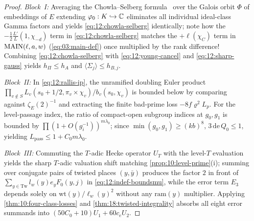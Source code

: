 
\begin{proof}
\emph{Block~I:} Averaging the Chowla--Selberg formula~\cite{ChowlaSelberg1967,Colmez1993} over the Galois orbit $\Phi$ of embeddings of $E$ extending $\varphi_0 : K \hookrightarrow \mathbb{C}$ eliminates all individual ideal-class Gamma factors and yields \eqref{eq:12:chowla-selberg} identically; note how the $-\frac{1}{2}\frac{L'}{L}(1, \chi_{-d})$ term in \eqref{eq:12:chowla-selberg} matches the $+\ell(\chi_C)$ term in $\mathrm{MAIN}(\ell, a, w)$ (\eqref{eq:03:main-def}) once multiplied by the rank difference! Combining \eqref{eq:12:chowla-selberg} with \eqref{eq:12:young-cancel} and \eqref{eq:12:sharp-gauss} yields $h_\Pi \le h_A$ and $\langle \Sigma_j \rangle \le h_{B, j}$.

\emph{Block~II:} In \eqref{eq:12:rallis-ip}, the unramified doubling Euler product $\prod_{v \notin S} L_v(s_0 + 1/2, \pi_v \times \chi_v) / b_v(s_0, \chi_v)$ is bounded below by comparing against $\zeta_E(2)^{-1}$ and extracting the finite bad-prime loss $-8f\varrho^2 L_p$. For the level-passage index, the ratio of compact-open subgroup indices at $g_0, g_1$ is bounded by $\prod (1 + O(g_i^{-1}))^{m\lambda_0}$; since $\min(g_0, g_1) \ge (k b)^8$, $3\,\mathrm{de}\,Q_0 \le 1$, yielding $L_{\mathrm{pass}} \le 1 + C_0 m \lambda_0$.

\emph{Block~III:} Commuting the $T$-adic Hecke operator $U_T$ with the level-$T$ evaluation yields the sharp $T$-adic valuation shift matching \cref{prop:10:level-prime}(i); summing over conjugate pairs of twisted places $(y, \bar{y})$ produces the factor $2$ in front of $\sum_{y \in \mathrm{Tw}} l_w(y) e_y F_0(y, j)$ in \eqref{eq:12:indef-boundsmu}, while the error term $E_3$ depends solely on $\mathrm{wt}(y)/\ell_w(y)^2$ without any $\mathrm{ram}(y)$ multiplier. Applying \cref{thm:10:four-class-losses} and \cref{thm:18:twisted-integrality} absorbs all eight error summands into $(50C_0 + 10)U_1 + 60 c_e U_2$.


\end{proof}
